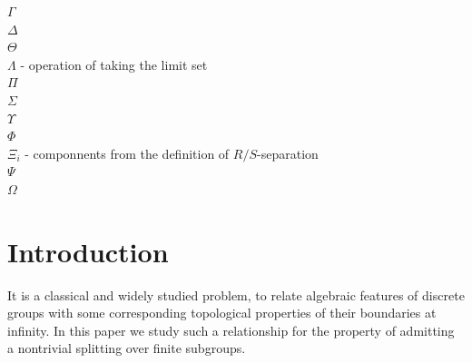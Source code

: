 \documentclass[12pt, a4paper]{article}
\newcommand{\8}{\infty}
\theoremstyle{break}
\theoremstyle{defbreak}
\begin{document}
{$\Gamma$\\
$\Delta$\\
$\Theta$\\
$\Lambda$ - operation of taking the limit set\\
$\Pi$\\
$\Sigma$\\
$\Upsilon$\\
$\Phi$\\
$\Xi_i$ - componnents from the definition of $R/S$-separation\\
$\Psi$\\
$\Omega$

\newpage}

\begin{abstract}
The {\it dense amalgam} is an operation (introduced in \cite{dense-amalgam}) which to any finite collection of metrizable compacta associates canonically some new highly disconnected compact metrisable space in which embedded copies of the initial spaces are appropriately uniformly and disjointly distributed. We show that in the very general framework of $E\mathcal{Z}$-boundaries (unifying many frameworks such as Gromov boundaries,
CAT(0)-boundaries, systolic boundaries, etc.),
any boundary $Z$ of an infinitely ended group $\Gamma$ equipped with an appropriate splitting along finite subgroups has a form of the dense amalgam of the limit sets in $Z$ of the factor subgroups of this splitting.
\end{abstract}

\section{Introduction}

It is a classical and widely studied problem, to relate algebraic features
of discrete groups with some corresponding topological properties of their
boundaries at infinity. In this paper we study such a relationship
for the property of admitting a nontrivial splitting over finite subgroups.
\end{document}
